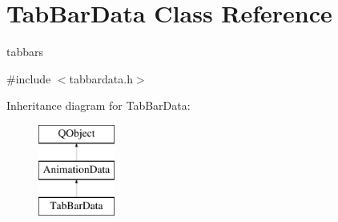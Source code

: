 \hypertarget{class_tab_bar_data}{}\section{Tab\+Bar\+Data Class Reference}
\label{class_tab_bar_data}


tabbars  




{\ttfamily \#include $<$tabbardata.\+h$>$}

Inheritance diagram for Tab\+Bar\+Data\+:\begin{figure}[H]
\begin{center}
\leavevmode
\includegraphics[height=3.000000cm]{class_tab_bar_data}
\end{center}
\end{figure}

